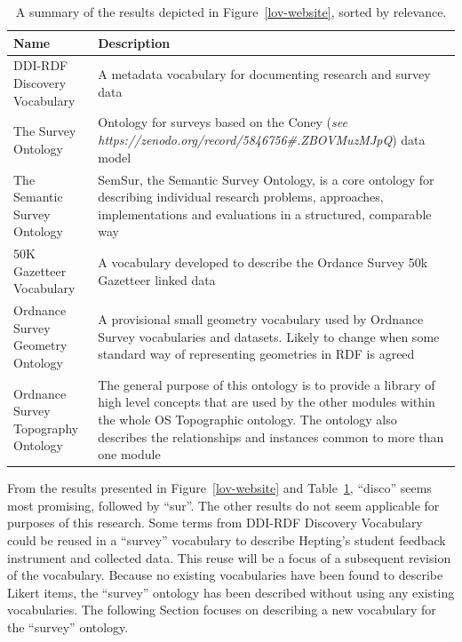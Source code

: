 \begin{doublespace}
\begin{table}[h]
\caption{A summary of the results depicted in Figure~\ref{lov-website}, sorted by relevance.}
\begin{center}
\begin{tabular}{|p{4.5cm}|p{10cm}|}
\hline
Name & Description \\
\hline
DDI-RDF Discovery Vocabulary & A metadata vocabulary for documenting research and survey data\\
\hline
The Survey Ontology & Ontology for surveys based on the Coney (\emph{see https://zenodo.org/record/5846756\#.ZBOVMuzMJpQ}) data model\\
\hline
The Semantic Survey Ontology & SemSur, the Semantic Survey Ontology, is a core ontology for 
describing individual research problems, approaches, implementations and evaluations in a structured, 
comparable way\\
\hline
50K Gazetteer Vocabulary & A vocabulary developed to describe the Ordance Survey 50k Gazetteer linked data\\
\hline
Ordnance Survey Geometry Ontology & A provisional small geometry vocabulary used by Ordnance 
Survey vocabularies and datasets. Likely to change when some standard way of representing geometries in 
RDF is agreed\\
\hline
Ordnance Survey Topography Ontology & The general purpose of this ontology is to provide a 
library of high level concepts that are used by the other modules within the whole OS Topographic 
ontology. The ontology also describes the relationships and instances common to more than one module\\
\hline
\end{tabular}
\end{center}
\label{tab:lov-results}
\end{table}%

From the results presented in Figure~\ref{lov-website} and Table~\ref{tab:lov-results}, 
``disco'' seems most promising, followed by ``sur''.
The other results do not seem applicable for purposes of this research.
Some terms from DDI-RDF Discovery Vocabulary~\cite{disco} could be reused
in a ``survey'' vocabulary to describe Hepting's student feedback instrument and collected data.
This reuse will be a focus of a subsequent revision of the vocabulary. 
Because no existing vocabularies have been found to describe Likert items, 
the ``survey'' ontology has been described without using any existing vocabularies. 
The following Section focuses on describing a new vocabulary for the ``survey'' ontology.


\end{doublespace}
